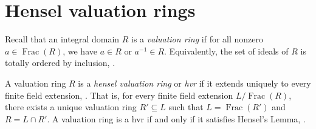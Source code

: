 \documentclass[10pt]{amsart}
\newtheorem{lemm}[theo]{Lemma}
\theoremstyle{definition}
\newcommand{\m}{\mathfrak{m}}
\DeclareMathOperator{\Spec}{Spec}
\DeclareMathOperator{\Tr}{Tr}
\DeclareMathOperator{\id}{id}
\DeclareMathOperator{\Frac}{Frac}
\newcommand{\perf}{{\operatorname{perf}}}
\newcommand{\fps}{{\operatorname{fps}}}
\newcommand{\uh}{\operatorname{uh}}
\newcommand{\red}{{\operatorname{red}}}
\begin{document}


\section{Hensel valuation rings} \label{sec:hvr}

Recall that an integral domain $R$ is a \emph{valuation ring} if for all nonzero $a \in \Frac(R)$, we have $a \in R$ or $a^{-1} \in R$. Equivalently, the set of ideals of $R$ is totally ordered by inclusion,  \cite[Chapitre VI, \S1.2, Théorème 1]{Bou64}.

A valuation ring $R$ is a \emph{hensel valuation ring} or \emph{hvr} if it extends uniquely to every finite field extension, \cite[\S4.1]{EP05}. That is, for every finite field extension $L / \Frac(R)$, there exists a unique valuation ring $R' \subseteq L$ such that $L = \Frac(R')$ and $R = L \cap R'$. A valuation ring is a hvr if and only if it satisfies Hensel's Lemma, \cite[Thm.4.1.3]{EP05}.
\end{document}
